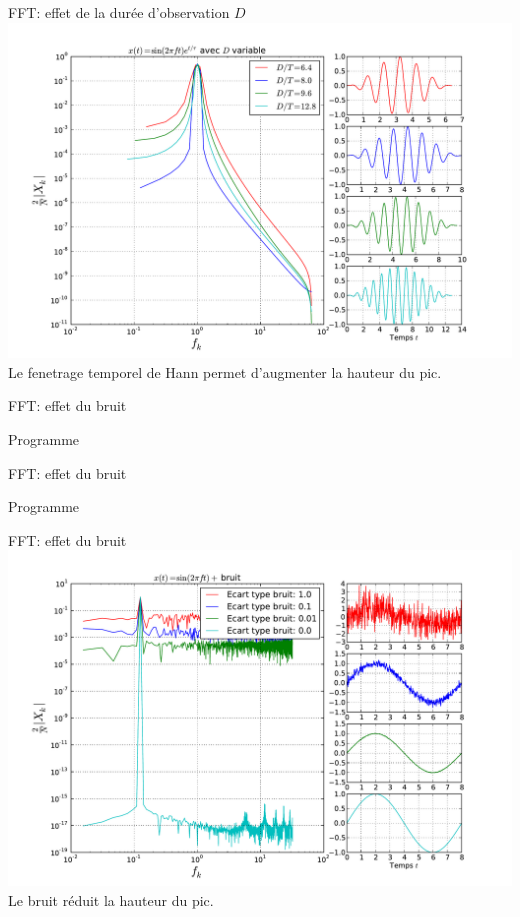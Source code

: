 \documentclass[8pt,a4paper]{beamer}
\begin{document}
\begin{frame}{FFT: effet de la durée d'observation $D$}
\includegraphics[width=1.\textwidth]{figures/FFT_D-hann.pdf} \\
\alert{Le fenetrage temporel de Hann permet d'augmenter la hauteur du pic.}
\end{frame}


\begin{frame}{FFT: effet du bruit}
\begin{block}{Programme}

\end{block}
\end{frame}
\begin{frame}{FFT: effet du bruit}
\begin{block}{Programme}

\end{block}
\end{frame}

\begin{frame}{FFT: effet du bruit}
\includegraphics[width=1.\textwidth]{figures/FFT_bruit.pdf} \\
\alert{Le bruit réduit la hauteur du pic.}
\end{frame}
\end{document}
